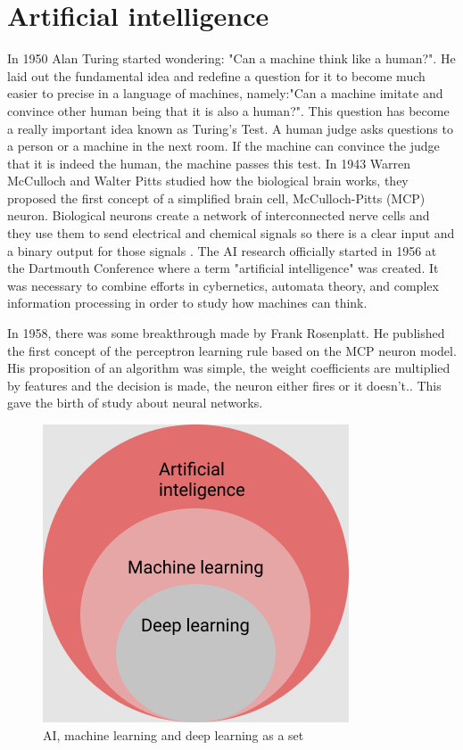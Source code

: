 \documentclass[a4paper,oneside,openright,11pt]{book}
\begin{document}
\section{Artificial intelligence}

In 1950 Alan Turing started wondering: "Can a machine think like a human?". He laid out the fundamental idea and redefine a question for it to become much easier to precise in a language of machines, namely:"Can a machine imitate and convince other human being that it is also a human?". This question has become a really important idea known as Turing's Test. A human judge asks questions to a person or a machine in the next room. If the machine can convince the judge that it is indeed the human, the machine passes this test. In 1943 Warren McCulloch and Walter Pitts studied how the biological brain works, they proposed the first concept of a simplified brain cell, McCulloch-Pitts (MCP) neuron. Biological neurons create a network of interconnected nerve cells and they use them to send electrical and chemical signals so there is a clear input and a binary output for those signals \cite{neuron}.
The AI research officially started in 1956 at the Dartmouth Conference where a term "artificial intelligence" was created. It was necessary to combine efforts in cybernetics, automata theory, and complex information processing in order to study how machines can think.\cite{histAI}

In 1958, there was some breakthrough made by Frank Rosenplatt. He published the first concept of the perceptron learning rule based on the MCP neuron model. His proposition of an algorithm was simple, the weight coefficients are multiplied by features and the decision is made, the neuron either fires or it doesn't.\cite{raschka}. This gave the birth of study about neural networks.


\begin{figure}[h!]
\centering
\includegraphics[scale=0.5]{DocumentFigures/MyFigures/zbiorki.png}
\caption{AI, machine learning and deep learning as a set}
\end{figure}
\end{document}

